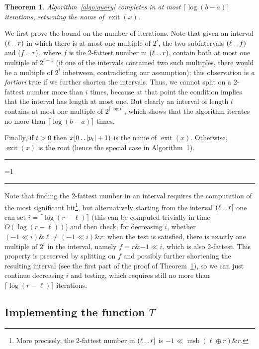 \documentclass{article}
\newtheorem{theorem}{Theorem}
\newcounter{noqed}
\newcommand{\qed}{ \ifmmode\mbox{ }\fi\rule[-.05em]{.3em}{.7em}\setcounter{noqed}{0}}
\newenvironment{proof}[1][{}]{\noindent{\bf Proof#1. }\setcounter{noqed}{1}}{\ifnum\value{noqed}=1\qed\fi\par\medskip}
\newcommand{\exit}[1]{\operatorname{exit}(#1)}
\newcommand{\?}{\mskip1.5mu}
\def\..{\,\mathpunct{\ldotp\ldotp}} %
\begin{document}
\begin{theorem}
\label{thm:correctnessfbs}
Algorithm~\ref{algo:query} completes in at most $\lceil\log(b-a)\rceil$
iterations, returning the name of $\exit x$.
\end{theorem}
\begin{proof}
We first prove the bound on the number of iterations. Note that given an
interval $(\ell\..r)$ in which there is at most one multiple of $2^i$, the two
subintervals $(\ell\..f)$ and $(f\..r)$, where $f$ is the 2-fattest number in
$(\ell\..r)$, contain both at most one multiple of $2^{i-1}$ (if one of the
intervals contained two such multiples, there would be a multiple of $2^i$
inbetween, contradicting our assumption); this observation is \emph{a fortiori}
true if we further shorten the intervals. Thus, we cannot
split on a 2-fattest number more than $i$ times, because at that point the
condition implies that the interval has length at most one. But clearly an interval of length $t$ contains at most one multiple of $2^{\lceil\log t\rceil}$, which shows that the algorithm
iterates no more than $\lceil\log(b-a)\rceil$ times.

Finally, if $t>0$ then $x[0\..|p_t|+1)$ is the name of $\exit x$.
Otherwise, $\exit x$ is the root (hence the special case in Algorithm~1).\qed
\end{proof}

Note that finding the 2-fattest number in an interval requires the computation of
the most significant bit\footnote{More precisely, the 2-fattest number in
$(\ell\..r]$ is $-1 \ll \operatorname{msb}(\ell \oplus r) \mathbin\& r$.}, but
alternatively starting from the interval $(\ell\..r]$
one can set $i=\lceil\log(r-\ell)\rceil$ (this can be computed trivially in time $O(\log(r-\ell))$)
and then check, for decreasing $i$, whether $(-1\ll i)\mathbin\& \ell \neq (-1\ll i)\mathbin\&
r$: when the test is satisfied, there is exactly one multiple of $2^i$ in the interval, 
namely $f=r \mathbin\& -1
\ll i$, which is also 2-fattest. This property is preserved by splitting on 
$f$ and possibly further shortening the resulting interval (see the first part
of the proof of Theorem~\ref{thm:correctnessfbs}), so we can just continue decreasing $i$ and testing, 
which requires still no more than $\lceil\log(r-\ell)\rceil$ iterations.

\subsection{Implementing the function $T$}
\end{document}
